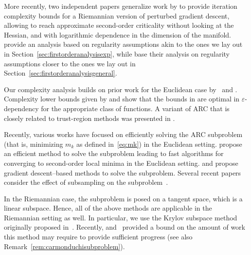 More recently, two independent papers generalize work by \citet{jin2019escape} to provide iteration complexity bounds for a Riemannian version of perturbed gradient descent, allowing to reach approximate second-order criticality without looking at the Hessian, and with logarithmic dependence in the dimension of the manifold. \citet{sun2019prgd} provide an analysis based on regularity assumptions akin to the ones we lay out in Section~\ref{sec:firstorderanalysisexp}, while \citet{criscitiello2019escapingsaddles} base their analysis on regularity assumptions closer to the ones we lay out in Section~\ref{sec:firstorderanalysisgeneral}.

Our complexity analysis builds on prior work for the Euclidean case by~\citet{cartis2011adaptivecubic} and \citet{bcgmt}. Complexity lower bounds given by \citet{cartis2018worst} and \citet{carmon2017lower} show that the bounds in \citep{nesterov2006cubic,cartis2011adaptivecubic,bcgmt} are optimal in $\varepsilon$-dependency for the appropriate class of functions. A variant of ARC that is closely related to trust-region methods was presented in \citep{dussault2018arcq}.

Recently, various works have focused on efficiently solving the ARC subproblem (that is, minimizing $m_k$ as defined in~\eqref{eq:mk}) in the Euclidean setting. \citet{agarwal2017finding} propose an efficient method to solve the subproblem leading to fast algorithms for converging to second-order local minima in the Euclidean setting. \citet{carmon2016gradient} and \citet{tripuraneni2017stochastic} propose gradient descent--based methods to solve the subproblem.
Several recent papers consider the effect of subsampling on the subproblem~\citep{tripuraneni2017stochastic,kohler2017sub,zhou2018stochastic,zhang2018adaptive,wang2018stochastic}.

In the Riemannian case, the subproblem is posed on a tangent space, which is a linear subspace. Hence, all of the above methods are applicable in the Riemannian setting as well. In particular, we use the Krylov subspace method originally proposed in~\citep{cartis2011adaptivecubic}. Recently, \citet{carmon2018analysis} and~\citet{gould2019regularizedquadratic} provided a bound on the amount of work this method may require to provide sufficient progress (see also Remark~\ref{rem:carmonduchisubproblem}).


